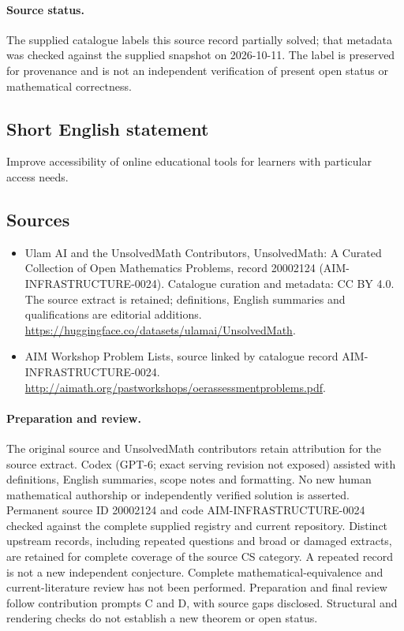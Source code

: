 \documentclass[11pt]{article}
\begin{document}
\paragraph{Source status.}
The supplied catalogue labels this source record partially solved; that metadata was checked against the supplied snapshot on 2026-10-11. The label is preserved for provenance and is not an independent verification of present open status or mathematical correctness.
\subsection{Short English statement}
Improve accessibility of online educational tools for learners with particular access needs.
\subsection{Sources}
\begin{itemize}
\item[\hypertarget{source:20002124:1}{S1}] Ulam AI and the UnsolvedMath Contributors, UnsolvedMath: A Curated Collection of Open Mathematics Problems, record 20002124 (AIM-INFRASTRUCTURE-0024). Catalogue curation and metadata: CC BY 4.0. The source extract is retained; definitions, English summaries and qualifications are editorial additions.
\url{https://huggingface.co/datasets/ulamai/UnsolvedMath}.
\item[\hypertarget{source:20002124:2}{S2}] AIM Workshop Problem Lists, source linked by catalogue record AIM-INFRASTRUCTURE-0024.
\url{http://aimath.org/pastworkshops/oerassessmentproblems.pdf}.
\end{itemize}
\paragraph{Preparation and review.}
The original source and UnsolvedMath contributors retain attribution for the source extract. Codex (GPT-6; exact serving revision not exposed) assisted with definitions, English summaries, scope notes and formatting. No new human mathematical authorship or independently verified solution is asserted. Permanent source ID 20002124 and code AIM-INFRASTRUCTURE-0024 checked against the complete supplied registry and current repository. Distinct upstream records, including repeated questions and broad or damaged extracts, are retained for complete coverage of the source CS category. A repeated record is not a new independent conjecture. Complete mathematical-equivalence and current-literature review has not been performed. Preparation and final review follow contribution prompts C and D, with source gaps disclosed. Structural and rendering checks do not establish a new theorem or open status.
\label{end:20002124}
\end{document}
